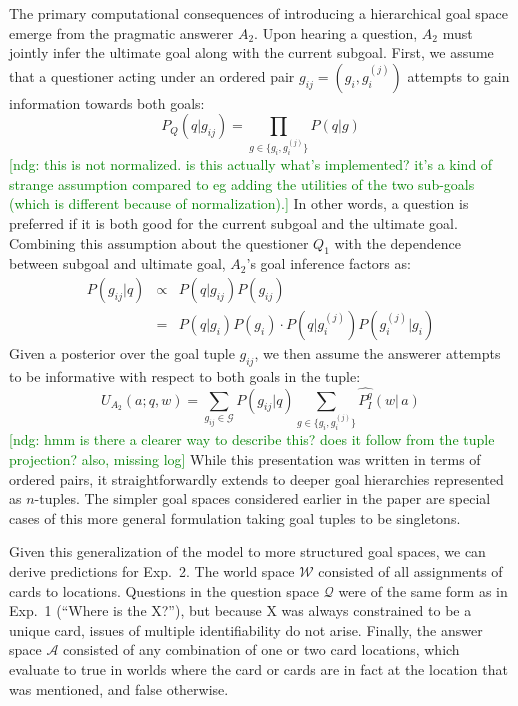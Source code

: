 \documentclass[11pt, floatsintext]{apa6}
\newcommand{\ndg}[1]{\textcolor{Green}{[ndg: #1]}}
\begin{document}
The primary computational consequences of introducing a hierarchical goal space emerge from the pragmatic answerer $A_2$. 
Upon hearing a question, $A_2$ must jointly infer the ultimate goal along with the current subgoal.
First, we assume that a questioner acting under an ordered pair $g_{ij} = (g_i, g_i^{(j)})$ attempts to gain information towards both goals:
$$P_{Q}(q | g_{ij}) = \prod_{g\in \{g_i, g_i^{(j)}\}} P(q | g)$$
\ndg{this is not normalized. is this actually what's implemented? it's a kind of strange assumption compared to eg adding the utilities of the two sub-goals (which is different because of normalization).}
In other words, a question is preferred if it is both good for the current subgoal and the ultimate goal.
Combining this assumption about the questioner $Q_1$ with the dependence between subgoal and ultimate goal, $A_2$'s goal inference factors as:
$$\begin{array}{rcl}
P(g_{ij} | q) & \propto & P(q | g_{ij})P(g_{ij}) \\
 & = & P(q | g_i)P(g_i) \cdot P(q | g_i^{(j)}) P(g_i^{(j)} | g_i)
 \end{array}$$
Given a posterior over the goal tuple $g_{ij}$, we then assume the answerer attempts to be informative with respect to both goals in the tuple: 
$$U_{A_2}(a; q, w) = \sum_{g_{ij} \in \mathcal{G}} P(g_{ij}|q) \sum_{g\in \{g_i, g_i^{(j)}\}}\widehat{P^g_I}(w|\,a)$$
 \ndg{hmm is there a clearer way to describe this? does it follow from the tuple projection? also, missing log}
While this presentation was written in terms of ordered pairs, it straightforwardly extends to deeper goal hierarchies represented as $n$-tuples. 
The simpler goal spaces considered earlier in the paper are special cases of this more general formulation taking goal tuples to be singletons.

Given this generalization of the model to more structured goal spaces, we can derive predictions for Exp.~2. 
The world space $\mathcal{W}$ consisted of all assignments of cards to locations.
Questions in the question space $\mathcal{Q}$ were of the same form as in Exp.~1 (``Where is the X?''), but because X was always constrained to be a unique card, issues of multiple identifiability do not arise. 
Finally, the answer space $\mathcal{A}$ consisted of any combination of one or two card locations, which evaluate to true in worlds where the card or cards are in fact at the location that was mentioned, and false otherwise.
\end{document}
